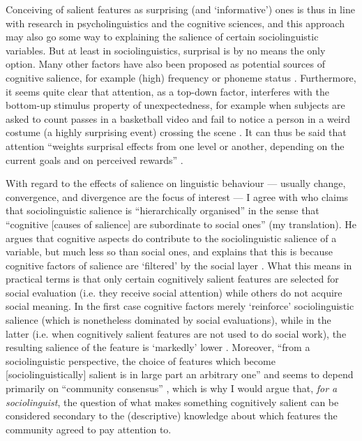 Conceiving of salient features as surprising (and `informative') ones is thus in line with research in psycholinguistics and the cognitive sciences, and this approach may also go some way to explaining the salience of certain sociolinguistic variables. 
But at least in sociolinguistics, surprisal is by no means the only option.
Many other factors have also been proposed as potential sources of cognitive salience, for example (high) frequency or phoneme status \parencite[cf.][8]{auer2014}.
Furthermore, it seems quite clear that attention, as a top-down factor, interferes with the bottom-up stimulus property of unexpectedness, for example when subjects are asked to count passes in a basketball video and fail to notice a person in a weird costume (a highly surprising event) crossing the scene \parencite[cf.][8]{zarconeetal2017}.
It can thus be said that attention \enquote{weights surprisal effects from one level or another, depending on the current goals and on perceived rewards} \parencite[8]{zarconeetal2017}.

With regard to the effects of salience on linguistic behaviour --- usually change, convergence, and divergence are the focus of interest --- I agree with \textcite[17]{auer2014} who claims that sociolinguistic salience is ``hierarchically organised'' in the sense that ``cognitive [causes of salience] are subordinate to social ones'' (my translation).
He argues that cognitive aspects do contribute to the sociolinguistic salience of a variable, but much less so than social ones, and explains that this is because cognitive factors of salience are `filtered' by the social layer \parencite[cf.][18]{auer2014}.
What this means in practical terms is that only certain cognitively salient features are selected for social evaluation (i.e. they receive social attention) while others do not acquire social meaning.
In the first case cognitive factors merely `reinforce' sociolinguistic salience (which is nonetheless dominated by social evaluations), while in the latter (i.e. when cognitively salient features are not used to do social work), the resulting salience of the feature is `markedly' lower \parencite[cf.][18]{auer2014}.
Moreover, \enquote{from a sociolinguistic perspective, the choice of features which become [sociolinguistically] salient is in large part an arbitrary one} and seems to depend primarily on \enquote{community consensus} \parencite[56]{llamasetal2017}, which is why I would argue that, \emph{for a sociolinguist}, the question of what makes something cognitively salient can be considered secondary to the (descriptive) knowledge about which features the community agreed to pay attention to.

